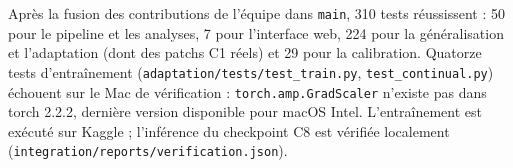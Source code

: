 Après la fusion des contributions de l'équipe dans \texttt{main}, 310 tests réussissent :
50 pour le pipeline et les analyses, 7 pour l'interface web, 224 pour la généralisation et
l'adaptation (dont des patchs C1 réels) et 29 pour la calibration. Quatorze tests
d'entraînement (\texttt{adaptation/tests/test\_train.py}, \texttt{test\_continual.py}) échouent
sur le Mac de vérification : \texttt{torch.amp.GradScaler} n'existe pas dans torch 2.2.2,
dernière version disponible pour macOS Intel. L'entraînement est exécuté sur Kaggle ;
l'inférence du checkpoint C8 est vérifiée localement
(\texttt{integration/reports/verification.json}).

\setlength{\emergencystretch}{0pt}
